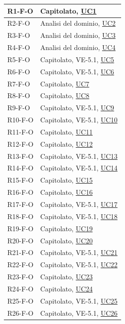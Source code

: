 \begin{longtable}{|p{2.8cm}|p{10.2cm}|}
	R1-F-O  & Capitolato, \hyperlink{uc1}{UC1} \\ \hline
	R2-F-O  & Analisi del dominio, \hyperlink{uc2}{UC2} \\ \hline
	R3-F-O  & Analisi del dominio, \hyperlink{uc3}{UC3} \\ \hline
	R4-F-O  & Analisi del dominio, \hyperlink{uc4}{UC4} \\ \hline
	R5-F-O  & Capitolato, VE-5.1, \hyperlink{uc5}{UC5} \\ \hline
	R6-F-O  & Capitolato, VE-5.1, \hyperlink{uc6}{UC6} \\ \hline
	R7-F-O  & Capitolato, \hyperlink{uc7}{UC7} \\ \hline
	R8-F-O  & Capitolato, \hyperlink{uc8}{UC8} \\ \hline
	R9-F-O  & Capitolato, VE-5.1, \hyperlink{uc9}{UC9} \\ \hline
	R10-F-O & Capitolato, VE-5.1, \hyperlink{uc10}{UC10} \\ \hline
	R11-F-O & Capitolato, \hyperlink{uc11}{UC11} \\ \hline
	R12-F-O & Capitolato, \hyperlink{uc12}{UC12} \\ \hline
	R13-F-O & Capitolato, VE-5.1, \hyperlink{uc13}{UC13} \\ \hline
	R14-F-O & Capitolato, VE-5.1, \hyperlink{uc14}{UC14} \\ \hline
	R15-F-O & Capitolato, \hyperlink{uc15}{UC15} \\ \hline
	R16-F-O & Capitolato, \hyperlink{uc16}{UC16} \\ \hline
	R17-F-O & Capitolato, VE-5.1, \hyperlink{uc17}{UC17} \\ \hline
	R18-F-O & Capitolato, VE-5.1, \hyperlink{uc18}{UC18} \\ \hline
	R19-F-O & Capitolato, \hyperlink{uc19}{UC19} \\ \hline
	R20-F-O & Capitolato, \hyperlink{uc20}{UC20} \\ \hline
	R21-F-O & Capitolato, VE-5.1, \hyperlink{uc21}{UC21} \\ \hline
	R22-F-O & Capitolato, VE-5.1, \hyperlink{uc22}{UC22} \\ \hline
	R23-F-O & Capitolato, \hyperlink{uc23}{UC23} \\ \hline
	R24-F-O & Capitolato, \hyperlink{uc24}{UC24} \\ \hline
	R25-F-O & Capitolato, VE-5.1, \hyperlink{uc25}{UC25} \\ \hline
	R26-F-O & Capitolato, VE-5.1, \hyperlink{uc26}{UC26} \\ \hline

\end{longtable}
